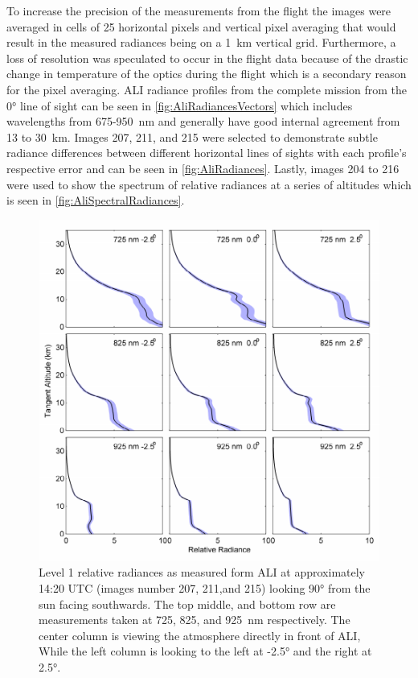 To increase the precision of the measurements from the flight the images were averaged in cells of 25 horizontal pixels and vertical pixel averaging that would result in the measured radiances being on a 1~km vertical grid. Furthermore, a loss of resolution was speculated to occur in the flight data because of the drastic change in temperature of the optics during the flight which is a secondary reason for the pixel averaging. ALI radiance profiles from the complete mission from the 0\si{\degree} line of sight can be seen in \autoref{fig:AliRadiancesVectors} which includes wavelengths from 675-950~nm and generally have good internal agreement from 13 to 30~km. Images 207, 211, and 215 were selected to demonstrate subtle radiance differences between different horizontal lines of sights with each profile's respective error and can be seen in \autoref{fig:AliRadiances}. Lastly, images 204 to 216 were used to show the spectrum of relative radiances at a series of altitudes which is seen in \autoref{fig:AliSpectralRadiances}.

\begin{figure}
\includegraphics[width=1.0\textwidth]{./Images/5-2-AliRadiances.pdf}
    \caption[TODO:Write This]{Level 1 relative radiances as measured form ALI at approximately 14:20 UTC (images number 207, 211,and 215) looking 90\si{\degree} from the sun facing southwards. The top middle, and bottom row are measurements taken at 725, 825, and 925~nm respectively. The center column is viewing the atmosphere directly in front of ALI, While the left column is looking to the left at -2.5\si{\degree} and the right at 2.5\si{\degree}. }
    \label{fig:5.2:AliRadiances}
\end{figure}

